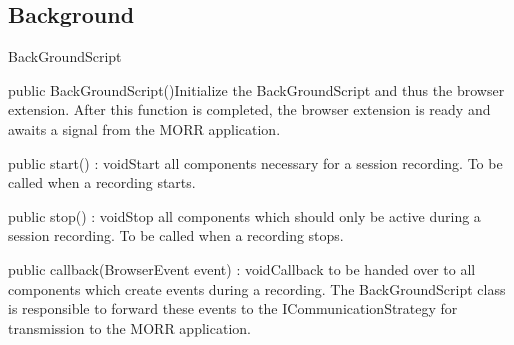 \subsection{Background}
\begin{class}{BackGroundScript}




\begin{constructors}
\begin{constructor}{public BackGroundScript()}{Initialize the BackGroundScript and thus the browser extension. After this function is completed, the browser extension is ready and awaits a signal from the MORR application.}
\end{constructor}
\end{constructors}
\begin{methods}
\begin{method}{public start() : void}{Start all components necessary for a session recording. To be called when a recording starts.}
\end{method}
\begin{method}{public stop() : void}{Stop all components which should only be active during a session recording. To be called when a recording stops.}
\end{method}
\begin{method}{public callback(BrowserEvent event) : void}{Callback to be handed over to all components which create events during a recording. The BackGroundScript class is responsible to forward these events to the ICommunicationStrategy for transmission to the MORR application.}
\begin{parameters}
\end{parameters}
\end{method}
\end{methods}
\end{class}

